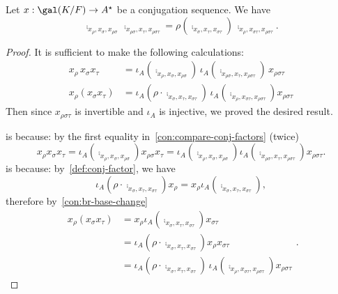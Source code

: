 \begin{lemma}\label{lem:compare-conj-factor-spec}
  Let $x : \gal(K/F) \to A^{\star}$ be a conjugation sequence. We have
  \[
    \comp_{x_{\rho}, x_{\sigma}, x_{\rho\sigma}}\,\comp_{x_{\rho\sigma},x_{\tau},x_{\rho\sigma\tau}} =
    \rho\left(\comp_{x_{\sigma},x_{\tau},x_{\sigma\tau}}\right)\,\comp_{x_{\rho}, x_{\sigma\tau}, x_{\rho\sigma\tau}}.
  \]
  \leanok
\end{lemma}
\begin{proof}
  It is sufficient to make the following calculations:
  \begin{align}
   x_{\rho}\,x_{\sigma}x_{\tau} &= \iota_{A}\left(\comp_{x_{\rho},x_{\sigma},x_{\rho\sigma}}\right) \, \iota_{A}\left(\comp_{x_{\rho\sigma}, x_{\tau}, x_{\rho\sigma\tau}}\right)\, x_{\rho\sigma\tau}\label{eq:1}\\
   x_{\rho}\left(x_{\sigma}x_{\tau}\right) &= \iota_{A}\left(\rho\cdot\comp_{x_{\sigma},x_{\tau},x_{\sigma\tau}}\right)\,\iota_{A}\left(\comp_{x_{\rho},x_{\sigma\tau},x_{\rho\sigma\tau}}\right) x_{\rho\sigma\tau} \label{eq:2}
 \end{align}
 Then since $x_{\rho\sigma\tau}$ is invertible and $\iota_{A}$ is injective, we proved the desired result.

  is because: by the first equality in~\cref{con:compare-conj-factors} (twice)
 \[
   x_{\rho}x_{\sigma}x_{\tau}=\iota_{A}\left(\comp_{x_{\rho},x_{\sigma}, x_{\rho\sigma}}\right)x_{\rho\sigma}x_{\tau}=\iota_{A}\left(\comp_{x_{\rho},x_{\sigma},x_{\rho\sigma}}\right)\iota_{A}\left(\comp_{x_{\rho\sigma},x_{\tau},x_{\rho\sigma\tau}}\right)x_{\rho\sigma\tau}.
 \]
  is because: by~\cref{def:conj-factor}, we have
 \[\iota_{A}\left(\rho\cdot\comp_{x_{\sigma},x_{\tau},x_{\sigma\tau}}\right)x_{\rho}=x_{\rho}\iota_{A}\left(\comp_{x_{\sigma},x_{\tau},x_{\sigma\tau}}\right),\]
 therefore by~\cref{con:br-base-change}
 \[
   \begin{aligned}
     x_{\rho}\left(x_{\sigma}x_{\tau}\right) &= x_{\rho}\iota_{A}\left(\comp_{x_{\sigma},x_{\tau},x_{\sigma\tau}}\right)x_{\sigma\tau} \\
                                             &= \iota_{A}\left(\rho\cdot \comp_{x_{\sigma},x_{\tau},x_{\sigma\tau}}\right)x_{\rho}x_{\sigma\tau}\\
     &= \iota_{A}\left(\rho\cdot\comp_{x_{\sigma},x_{\tau},x_{\sigma\tau}}\right)\,\iota_{A}\left(\comp_{x_{\rho},x_{\sigma\tau},x_{\rho\sigma\tau}}\right)x_{\rho\sigma\tau}
   \end{aligned}.
 \]
\end{proof}

